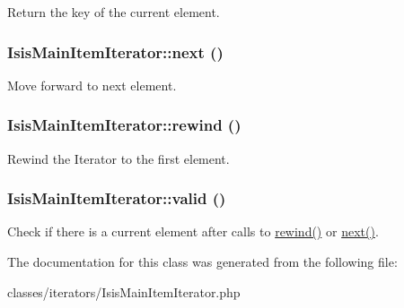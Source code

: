 \label{classIsisMainItemIterator_a3676fc993eb38641c65363f2e05873f3}
Return the key of the current element. \hypertarget{classIsisMainItemIterator_af63043a1ab350854c0a30561ccb42dae}{
\subsubsection[{next}]{\setlength{\rightskip}{0pt plus 5cm}IsisMainItemIterator::next ()}}
\label{classIsisMainItemIterator_af63043a1ab350854c0a30561ccb42dae}
Move forward to next element. \hypertarget{classIsisMainItemIterator_a37bf1484646334c5c41d3f7f50558b07}{
\subsubsection[{rewind}]{\setlength{\rightskip}{0pt plus 5cm}IsisMainItemIterator::rewind ()}}
\label{classIsisMainItemIterator_a37bf1484646334c5c41d3f7f50558b07}
Rewind the Iterator to the first element. \hypertarget{classIsisMainItemIterator_a376387f6168a95890fc9f3a441967135}{
\subsubsection[{valid}]{\setlength{\rightskip}{0pt plus 5cm}IsisMainItemIterator::valid ()}}
\label{classIsisMainItemIterator_a376387f6168a95890fc9f3a441967135}
Check if there is a current element after calls to \hyperlink{classIsisMainItemIterator_a37bf1484646334c5c41d3f7f50558b07}{rewind()} or \hyperlink{classIsisMainItemIterator_af63043a1ab350854c0a30561ccb42dae}{next()}. 

The documentation for this class was generated from the following file:\begin{DoxyCompactItemize}
\item 
classes/iterators/IsisMainItemIterator.php\end{DoxyCompactItemize}

